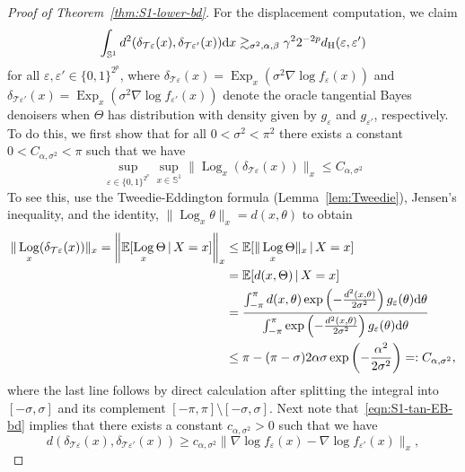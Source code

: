 \documentclass[preprint]{imsart}
\theoremstyle{plain}
\theoremstyle{definition}
\newcommand{\Ebb}{\mathbb{E}}
\newcommand{\diff}{\textnormal{d}}
\newcommand{\T}{\mathcal{T}}
\DeclareMathOperator{\Log}{Log}
\DeclareMathOperator{\Exp}{Exp}
\begin{document}
\begin{appendix}
\begin{proof}[Proof of Theorem~\ref{thm:S1-lower-bd}]
    For the displacement computation, we claim
    \begin{equation}\label{eqn:displacement-computation}
        \int_{\mathbb{S}^1}d^2(\delta_{\T\varepsilon}(x),\delta_{\T\varepsilon'}(x))\diff x \gtrsim_{\sigma^2,\alpha,\beta}\gamma^22^{-2p}d_{\mathrm{H}}(\varepsilon,\varepsilon')
    \end{equation}
    for all $\varepsilon,\varepsilon'\in\{0,1\}^{2^p}$, where $\delta_{\T\varepsilon}(x)= \Exp_x(\sigma^2\nabla \log f_{\varepsilon}(x))$ and $\delta_{\T\varepsilon'}(x)= \Exp_x(\sigma^2\nabla \log f_{\varepsilon'}(x))$ denote the oracle tangential Bayes denoisers when $\Theta$ has distribution with density given by $g_{\varepsilon}$ and $g_{\varepsilon'}$, respectively.
    To do this, we first show that for all $0<\sigma^2<\pi^2$ there exists a constant $0<C_{\alpha,\sigma^2}<\pi$ such that we have
    \begin{equation}\label{eqn:S1-tan-EB-bd}
        \sup_{\varepsilon\in\{0,1\}^{2^p}}\sup_{x\in\mathbb{S}^1}\|\Log_x(\delta_{\T\varepsilon}(x))\|_x\le C_{\alpha,\sigma^2}
    \end{equation}
    To see this, use the Tweedie-Eddington formula (Lemma~\ref{lem:Tweedie}), Jensen's inequality, and the identity, $\|\Log_x\theta\|_x=d(x,\theta)$ to obtain
    \begin{align*}
        \|\Log_x(\delta_{\T\varepsilon}(x))\|_x = \left\|\Ebb[\Log_x\Theta\,|\,X=x]\right\|_x&\le \Ebb[\|\Log_x\Theta\|_x\,|\,X=x] \\
        &= \Ebb[d(x,\Theta)\,|\,X=x] \\
        &= \frac{\int_{-\pi}^{\pi}d(x,\theta)\exp\left(-\frac{d^2(x,\theta)}{2\sigma^2}\right)g_{\varepsilon}(\theta)\diff\theta}{\int_{-\pi}^{\pi}\exp\left(-\frac{d^2(x,\theta)}{2\sigma^2}\right)g_{\varepsilon}(\theta)\diff\theta} \\
        &\le \pi - (\pi-\sigma)2\alpha\sigma\exp\left(-\frac{\alpha^2}{2\sigma^2}\right) =: C_{\alpha,\sigma^2},
    \end{align*}
    where the last line follows by direct calculation after splitting the integral into $[-\sigma,\sigma]$ and its complement $[-\pi,\pi]\setminus[-\sigma,\sigma]$.
    Next note that~\eqref{eqn:S1-tan-EB-bd} implies that there exists a constant $c_{\alpha,\sigma^2}>0$ such that we have
    \begin{equation*}
        d\left(\delta_{\T\varepsilon}(x),\delta_{\T\varepsilon'}(x)\right) \ge c_{\alpha,\sigma^2}\|\nabla \log f_{\varepsilon}(x)-\nabla \log f_{\varepsilon'}(x)\|_x,
    \end{equation*}

\end{proof}
\end{appendix}
\end{document}
